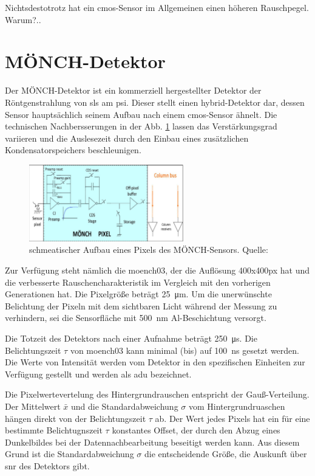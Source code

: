 \noindent
Nichtsdestotrotz hat ein \gls{cmos}-Sensor im Allgemeinen einen höheren Rauschpegel. Warum?..

\section{MÖNCH-Detektor}
Der MÖNCH-Detektor ist ein kommerziell hergestellter Detektor der Röntgenstrahlung von \gls{sls} am \gls{psi}. Dieser stellt einen hybrid-Detektor dar, dessen Sensor hauptsächlich seinem Aufbau nach einem \gls{cmos}-Sensor ähnelt. Die technischen Nachbersserungen in der Abb. \ref{fig:moench_pixel} lassen das Verstärkungsgrad variieren und die Auslesezeit durch den Einbau eines zusätzlichen Kondensatorspeichers beschleunigen.
\begin{figure}[H]
    \centering
    \includegraphics[width=0.6\textwidth]{images/moench/paper_crop.png}
    \caption{schmeatischer Aufbau eines Pixels des MÖNCH-Sensors. Quelle: \cite{dinapoli_monch_2014}}
    \label{fig:moench_pixel}
\end{figure}

\noindent
Zur Verfügung steht nämlich die \gls{moench03}, der die Auflösung 400x400px hat und die verbesserte Rauschencharakteristik im Vergleich mit den vorherigen Generationen hat. Die Pixelgröße beträgt \SI{25}{\micro\meter}. Um die unerwünschte Belichtung der Pixeln mit dem sichtbaren Licht während der Messung zu verhindern, sei die Sensorfläche mit \SI{500}{\nano\meter} Al-Beschichtung versorgt.

\noindent
Die Totzeit des Detektors nach einer Aufnahme beträgt \SI{250}{\micro\second}. Die Belichtungszeit $\tau$ von \gls{moench03} kann minimal (bis) auf \SI{100}{\nano\second} gesetzt werden. Die Werte von Intensität werden vom Detektor in den spezifischen Einheiten zur Verfügung gestellt und werden als \gls{adu} bezeichnet.

\noindent
Die Pixelwertevertelung des Hintergrundrauschen entspricht der Gauß-Verteilung. Der Mittelwert $\bar{x}$ und die Standardabweichung $\sigma$ vom Hintergrundruaschen hängen direkt von der Belichtungszeit $\tau$ ab. Der Wert jedes Pixels hat ein für eine bestimmte Belichtugnszeit $\tau$ konstantes Offset, der durch den Abzug eines Dunkelbildes bei der Datennachbearbeitung beseitigt werden kann. Aus diesem Grund ist die Standardabweichung $\sigma$ die entscheidende Größe, die Auskunft über \gls{snr} des Detektors gibt.


